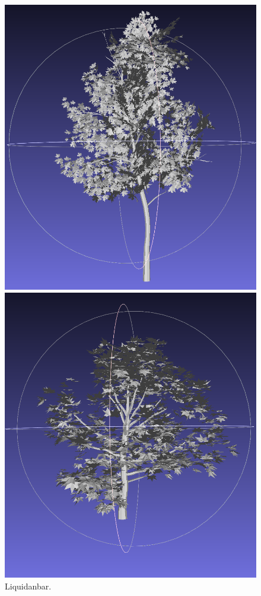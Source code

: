 \documentclass[12pt]{article}
\begin{document}
\begin{figure}[H]
\begin{minipage}{0.24\textwidth}
        \includegraphics[width=\textwidth]{images/liquidanbar.png}
        \caption{Liquidanbar.}
    \end{minipage}\hfill
    \begin{minipage}{0.24\textwidth}
        \centering
        \includegraphics[width=\textwidth]{images/platanus.png}

\end{minipage}
\end{figure}
\end{document}
